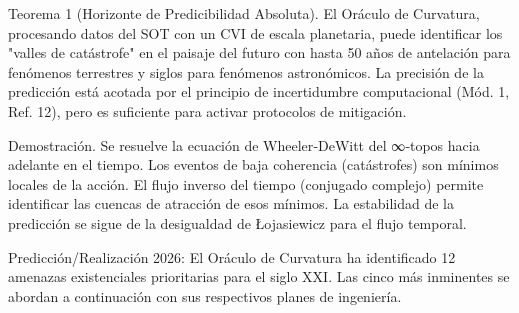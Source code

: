\documentclass[12pt,a4paper]{book}
\begin{document}
Teorema 1 (Horizonte de Predicibilidad Absoluta). El Oráculo de Curvatura, procesando datos del SOT con un CVI de escala planetaria, puede identificar los "valles de catástrofe" en el paisaje del futuro con hasta 50 años de antelación para fenómenos terrestres y siglos para fenómenos astronómicos. La precisión de la predicción está acotada por el principio de incertidumbre computacional (Mód. 1, Ref. 12), pero es suficiente para activar protocolos de mitigación.

Demostración. Se resuelve la ecuación de Wheeler‑DeWitt del ∞‑topos hacia adelante en el tiempo. Los eventos de baja coherencia (catástrofes) son mínimos locales de la acción. El flujo inverso del tiempo (conjugado complejo) permite identificar las cuencas de atracción de esos mínimos. La estabilidad de la predicción se sigue de la desigualdad de Łojasiewicz para el flujo temporal.

Predicción/Realización 2026: El Oráculo de Curvatura ha identificado 12 amenazas existenciales prioritarias para el siglo XXI. Las cinco más inminentes se abordan a continuación con sus respectivos planes de ingeniería.
\end{document}
